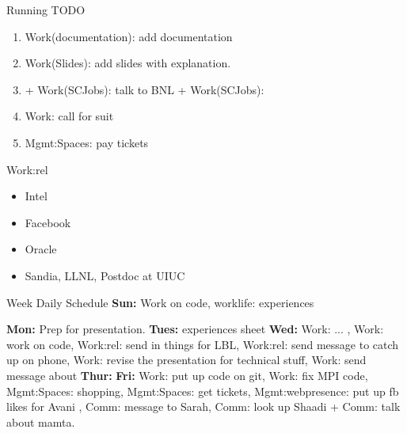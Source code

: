 \begin{frame}
\begin{columns}
\begin{column}{0.50\linewidth}
\begin{block}{Running TODO}
\begin{enumerate}
        +
         +
       Work: Test code for PlasComCM + Work(GPUcode): run code on
       xpacc cluster 


     \item \tiny Work(documentation): add documentation 
     \item \tiny Work(Slides): add slides with explanation.

         
       \item \tiny {} +
         Work(SCJobs): talk to BNL + Work(SCJobs): 
         \tiny \item \tiny Work: call for suit  
       \item \tiny Mgmt:Spaces: pay tickets 
        \end{enumerate}
      \end{block} 

      \begin{block}{Work:rel}
        \begin{itemize} 
        \item \tiny Intel 
        \item \tiny Facebook
        \item \tiny Oracle
          \tiny \item \tiny Sandia, LLNL, Postdoc at UIUC  
        \end{itemize}
      \end{block}

      \begin{block}{Week Daily Schedule} 
        {\small \textbf{Sun:} Work on code, worklife: experiences  }
        {\small \textbf{Mon:} Prep for presentation. \small
          \textbf{Tues:} experiences sheet\small
          \textbf{Wed:} Work: ... , Work: work on code, Work:rel: send in things for
          LBL,  Work:rel: send message to catch up on phone, Work:
          revise the presentation for technical stuff, Work: send
          message about 
          \small \textbf{Thur:}
          \small \textbf{Fri:}  Work: put up
          code on git, Work: fix MPI code, Mgmt:Spaces: shopping,
          Mgmt:Spaces: get tickets, Mgmt:webpresence: put up fb likes
          for Avani ,  Comm: message to Sarah,  Comm: look up Shaadi +
          Comm: talk about mamta.

}
\end{block}
\end{column}
\end{columns}
\end{frame}
